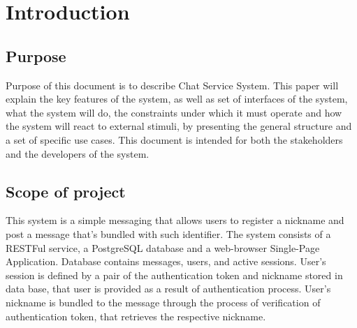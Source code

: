 \documentclass[12pt]{article}
\begin{document}
	\section{Introduction}
	\subsection{Purpose}
	Purpose of this document is to describe Chat Service System. This paper will explain the key features of the system, as well as set of interfaces of the system, what the system will do, the constraints under which it must operate and how the system will react to external stimuli, by presenting the general structure and a set of specific use cases. This document is intended for both the stakeholders and the developers of the system.
	\subsection{Scope of project}
	This system is a simple messaging that allows users to register a nickname and post a message that's bundled with such identifier. The system consists of a RESTFul service, a PostgreSQL database and a web-browser Single-Page Application. Database contains messages, users, and active sessions. User's session is defined by a pair of the authentication token and nickname stored in data base, that user is provided as a result of authentication process. User's nickname is bundled to the message through the process of verification of authentication token, that retrieves the respective nickname.
\end{document}
